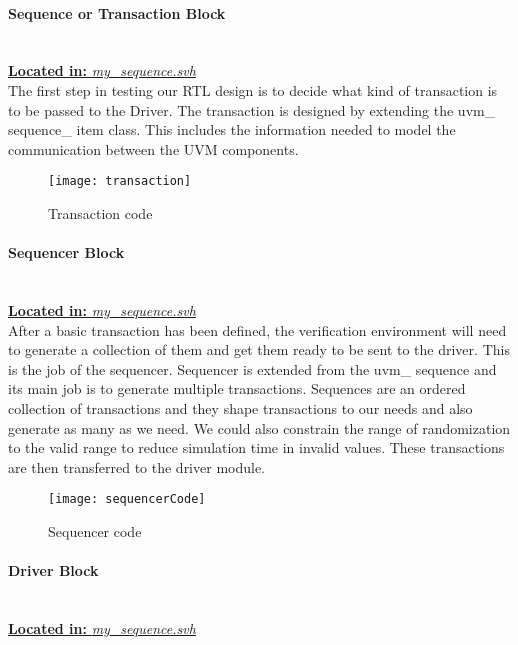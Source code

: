 \documentclass[a4paper,11pt]{article}
\begin{document}
\FloatBarrier
\paragraph{Sequence or Transaction Block}\mbox{}\\
\underline{\textbf{Located in:} \textit{my\_sequence.svh}}\\

The first step in testing our RTL design is to decide what kind of transaction is to be passed to the Driver. The transaction is designed by extending the uvm\_ sequence\_ item class. This includes the information needed to model the communication between the UVM components.

\begin{figure}[ht]
\centering
\texttt{[image: transaction]}
\caption{Transaction code}
\end{figure}

\FloatBarrier
\paragraph{Sequencer Block}\mbox{}\\
\underline{\textbf{Located in:} \textit{my\_sequence.svh}}\\

After a basic transaction has been defined, the verification environment will need to generate a collection of them and get them ready to be sent to the driver. This is the job of the sequencer. Sequencer is extended from the uvm\_ sequence and its main job is to generate multiple transactions. Sequences are an ordered collection of transactions and they shape transactions to our needs and also generate as many as we need. We could also constrain the range of randomization to the valid range to reduce simulation time in invalid values. 
These transactions are then transferred to the driver module.

\begin{figure}[ht]
\centering
\texttt{[image: sequencerCode]}
\caption{Sequencer code}
\end{figure}

\FloatBarrier
\paragraph{Driver Block}\mbox{}\\
\underline{\textbf{Located in:} \textit{my\_sequence.svh}}\\
\end{document}
